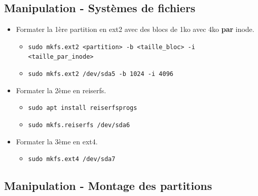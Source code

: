 \documentclass[a4paper]{article}
\begin{document}
\subsection{Manipulation - Systèmes de fichiers}





\begin{itemize}

\item Formater la 1ère partition en ext2 avec des blocs de 1ko avec 4ko \textbf{par} inode.
\begin{example}
    \begin{itemize}
        \item \texttt{sudo mkfs.ext2 <partition> -b <taille\_bloc> -i <taille\_par\_inode>}
        \item \texttt{sudo mkfs.ext2 /dev/sda5 -b 1024 -i 4096}
    \end{itemize}
\end{example}

\item Formater la 2ème en reiserfs.
\begin{example}
    \begin{itemize}
        \item \texttt{sudo apt install reiserfsprogs}
        \item \texttt{sudo mkfs.reiserfs /dev/sda6}
    \end{itemize}
\end{example}

\item Formater la 3ème en ext4.
\begin{example}
    \begin{itemize}
        \item \texttt{sudo mkfs.ext4 /dev/sda7}
    \end{itemize}
\end{example}

\end{itemize}










\subsection{Manipulation - Montage des partitions}
\end{document}
